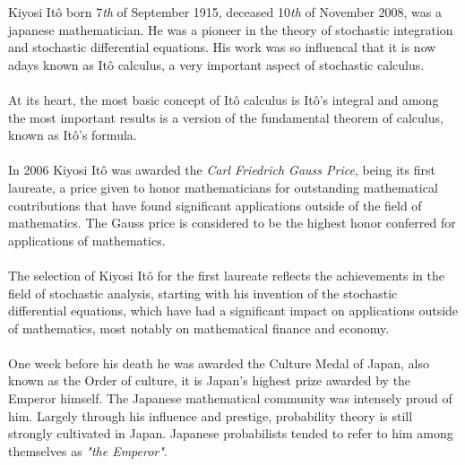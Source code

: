 \documentclass[11pt,a4paper, final]{article}
\begin{document}
\noindent Kiyosi Itô born 7\textit{th} of September 1915, deceased 10\textit{th} of November 2008, was a japanese mathematician. He was a pioneer in the theory of stochastic integration and stochastic differential equations. His work was so influencal that it is now adays known as Itô calculus, a very important aspect of stochastic calculus. 
\\\\
At its heart, the most basic concept of Itô calculus is Itô's integral and among the most important results is a version of the fundamental theorem of calculus, known as Itô's formula.
\\\\
In 2006 Kiyosi Itô was awarded the \textit{Carl Friedrich Gauss Price}, being its first laureate, a price given to honor mathematicians for outstanding mathematical contributions that have found significant applications outside of the field of mathematics. The Gauss price is considered to be the highest honor conferred for applications of mathematics.
\\
\\
The selection of Kiyosi Itô for the first laureate reflects the achievements in the field of stochastic analysis, starting with his invention of the stochastic differential equations, which have had a significant impact on applications outside of mathematics, most notably on mathematical finance and economy. 
\\\\
One week before his death he was awarded the Culture Medal of Japan, also known as the Order of culture, it is Japan's highest prize awarded by the Emperor himself. The Japanese mathematical community was intensely proud of him. Largely through his influence and prestige, probability theory is still strongly cultivated in Japan. Japanese probabilists tended to refer to him among themselves as \textit{"the Emperor"}. 
\newpage 
\end{document}
